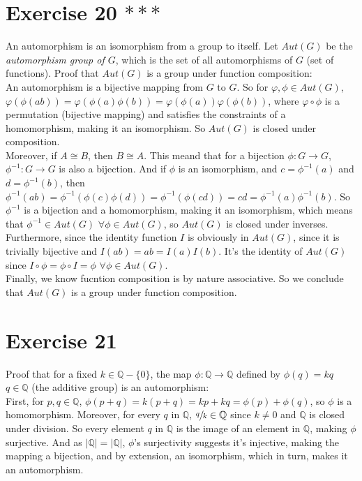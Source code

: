 \documentclass[12pt]{article}
\newcommand{\Q}{\mathbb{Q}}
\begin{document}
    \section*{Exercise 20 $***$}
    An automorphism is an isomorphism from a group to itself.
    Let $Aut(G)$ be the \textit{automorphism group of $G$},
    which is the set of all automorphisms of $G$ (set of functions).
    Proof that $Aut(G)$ is a group under function composition: \\
    An automorphism is a bijective mapping from $G$ to $G$.
    So for $\varphi, \phi \in Aut(G)$,
    $\varphi(\phi(ab)) = \varphi(\phi(a)\phi(b))
    = \varphi(\phi(a))\varphi(\phi(b))$,
    where $\varphi \circ \phi$ is a permutation (bijective mapping)
    and satisfies the constraints of a homomorphism, making it an
    isomorphism.
    So $Aut(G)$ is closed under composition. \\ 
    Moreover, if $A \cong B$, then $B \cong A$.
    This meand that for a bijection $\phi: G \to G$,
    $\phi^{-1}: G \to G$ is also a bijection.
    And if $\phi$ is an isomorphism,
    and $c = \phi^{-1}(a)$ and $d = \phi^{-1}(b)$,
    then $\phi^{-1}(ab) = \phi^{-1}(\phi(c)\phi(d))
    = \phi^{-1}(\phi(cd))
    = cd
    = \phi^{-1}(a)\phi^{-1}(b)$.
    So $\phi^{-1}$ is a bijection and a homomorphism, 
    making it an isomorphism,
    which means that $\phi^{-1} \in Aut(G)$ $\forall \phi \in Aut(G)$,
    so $Aut(G)$ is closed under inverses. \\
    Furthermore, since the identity function $I$ is obviously in $Aut(G)$,
    since it is trivially bijective
    and $I(ab) = ab = I(a)I(b)$.
    It's the identity of $Aut(G)$
    since $I \circ \phi = \phi \circ I = \phi$ $\forall \phi \in Aut(G)$. \\
    Finally, we know fucntion composition is by nature associative.
    So we conclude that $Aut(G)$ is a group under function composition.


    \section*{Exercise 21}
    Proof that for a fixed $k \in \Q - \{0\}$,
    the map $\phi : \Q \to \Q$ defined by $\phi(q) = kq$ $q \in \Q$ 
    (the additive group) is an automorphism: \\
    First, for $p, q \in \Q$,
    $\phi(p + q) = k(p + q) = kp + kq = \phi(p) + \phi(q)$,
    so $\phi$ is a homomorphism.
    Moreover, for every $q$ in $\Q$, $\sfrac{q}{k} \in \Q$
    since $k \neq 0$ and $\Q$ is closed under division.
    So every element $q$ in $\Q$ is the image of an element in $\Q$,
    making $\phi$ surjective.
    And as $|\Q| = |\Q|$, $\phi$'s surjectivity suggests it's injective,
    making the mapping a bijection,
    and by extension, an isomorphism,
    which in turn, makes it an automorphism.
\end{document}
